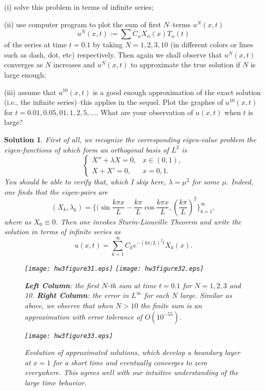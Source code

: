 \documentclass[6pt]{article}
\newtheorem{solution}{Solution}
\numberwithin{equation}{section}
\begin{document}
\begin{enumerate}
(i)  solve this problem in terms of infinite series;

(ii) use computer program to plot the sum of first $N$--terms $u^N(x,t)$
\[u^N(x,t):=\sum C_nX_n(x)T_n(t)\]
of the series at time $t=0.1$ by taking $N=1, 2, 3, 10$ (in different colors or lines such as dash, dot, etc) respectively.  Then again we shall observe that $u^N(x,t)$ converges as $N$ increases and $u^N(x,t)$ to approximate the true solution if $N$ is large enough;

(iii) assume that $u^{10}(x,t)$ is a good enough approximation of the exact solution (i.e., the infinite series)--this applies in the sequel.  Plot the graphes of $u^{10}(x,t)$ for $t=0.01,0.05,01,1,2,5,...$.   What are your observation of $u(x,t)$ when $t$ is large?
\begin{solution}
First of all, we recognize the corresponding eigen-value problem the eigen-functions of which form an orthogonal basis of $L^2$ is
\[
\left\{
\begin{array}{ll}
X''+\lambda X=0,& x\in (0,1),\\
X+X'=0, & x=0,1.
\end{array}
\right.
\]
You should be able to verify that, which I skip here, $\lambda=\mu^2$ for some $\mu$.  Indeed, one finds that the eigen-pairs are
\[(X_k,\lambda_k)=\Big\{\Big(\sin \frac{k\pi x}{L}-\frac{k\pi}{L}\cos \frac{k\pi x}{L},(\frac{k\pi}{L})^2\Big\}_{k=1}^\infty,\]
where as $X_0\equiv 0$.  Then one invokes Sturm-Liouville Theorem and write the solution in terms of infinite series as
\[u(x,t)=\sum_{k=1}^\infty C_ke^{-(k\pi/L)^2t}X_k(x).\]

\begin{figure}[h]
  \centering
\texttt{[image: hw3figure31.eps]}\hspace{-8mm}
\texttt{[image: hw3figure32.eps]}
\caption{\textbf{Left Column}: the first $N$-th sum at time $t=0.1$ for $N=1,2,3$ and 10.  \textbf{Right Column}: the error in $L^\infty$ for each $N$ large.  Similar as above, we observe that when $N>10$ the finite sum is an approximation with error tolerance of $O(10^{-55})$.}
\end{figure}

\begin{figure}[h]
  \centering
\texttt{[image: hw3figure33.eps]}
\caption{Evolution of approximated solutions, which develop a boundary layer at $x=1$ for a short time and eventually converges to zero everywhere.  This agrees well with our intuitive understanding of the large time behavior.}
\end{figure}


\end{solution}
\end{enumerate}
\end{document}

